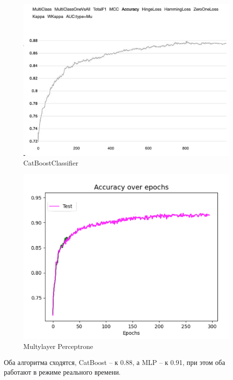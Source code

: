         \begin{figure}[h!]
                \centering
                \includegraphics[scale=0.2]{pictures/2022-06-21 02.22.10.jpg}
                \caption{CatBoostClassifier
                }
                \label{fig:my_label}
            \end{figure} 
        \begin{figure}[h!]
                \centering
                \includegraphics[scale=0.5]{pictures/realtime.png}
                \caption{Multylayer Perceptrone
                }
                \label{fig:my_label}
            \end{figure} 
            Оба алгоритма сходятся, CatBoost – к 0.88, а MLP – к 0.91, при этом оба работают в режиме реального времени.
        \noindent
